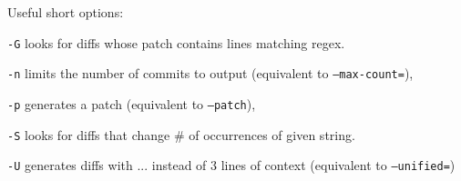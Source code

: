 Useful short options:
\begin{compactenum}
\item [\texttt{-G}] looks for diffs whose patch contains lines matching regex.
\item [\texttt{-n}] limits the number of commits to output (equivalent to \texttt{--max-count=}),
\item [\texttt{-p}] generates a patch (equivalent to \texttt{--patch}),
\item [\texttt{-S}] looks for diffs that change \# of occurrences of given string.
\item [\texttt{-U}] generates diffs with ... instead of 3 lines of context (equivalent to \texttt{--unified=})
\end{compactenum}

%
